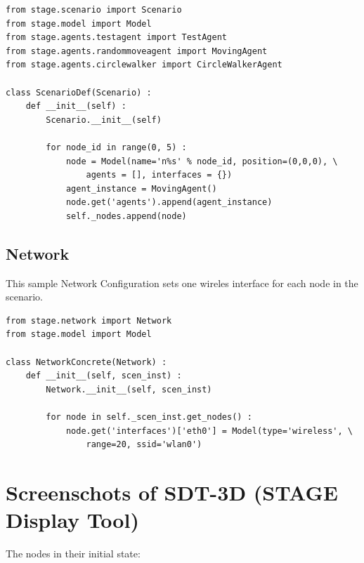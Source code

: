 \documentclass{article}
\begin{document}
\begin{verbatim}
from stage.scenario import Scenario
from stage.model import Model
from stage.agents.testagent import TestAgent
from stage.agents.randommoveagent import MovingAgent
from stage.agents.circlewalker import CircleWalkerAgent

class ScenarioDef(Scenario) :
    def __init__(self) :
        Scenario.__init__(self)

        for node_id in range(0, 5) :
            node = Model(name='n%s' % node_id, position=(0,0,0), \
                agents = [], interfaces = {})
            agent_instance = MovingAgent()
            node.get('agents').append(agent_instance)
            self._nodes.append(node)
\end{verbatim}

\subsection{Network}
This sample Network Configuration sets one wireles interface for each node in the scenario.
\begin{verbatim}
from stage.network import Network
from stage.model import Model

class NetworkConcrete(Network) :
    def __init__(self, scen_inst) :
        Network.__init__(self, scen_inst)

        for node in self._scen_inst.get_nodes() :
            node.get('interfaces')['eth0'] = Model(type='wireless', \
                range=20, ssid='wlan0')
\end{verbatim}

\section{Screenschots of SDT-3D (STAGE Display Tool)}
The nodes in their initial state:
\end{document}
